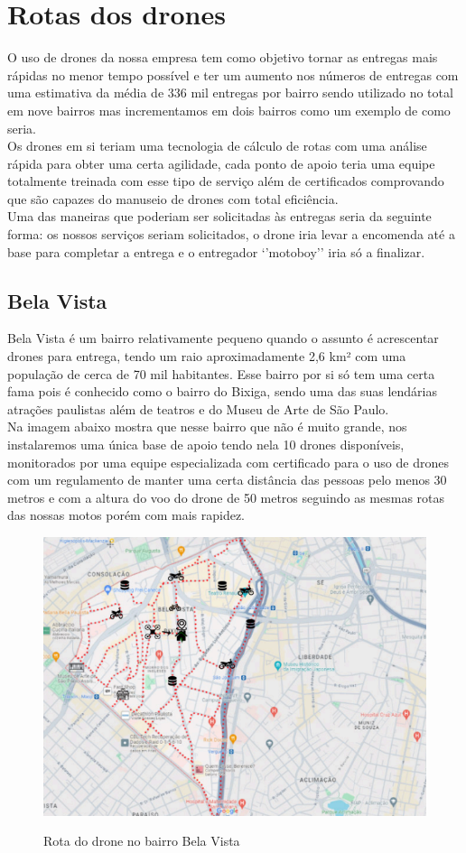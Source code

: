 \chapter{Rotas dos drones}
\label{ch:identificador}
  
O uso de drones da nossa empresa tem como objetivo tornar as entregas mais rápidas no menor tempo possível e ter um aumento nos números de entregas com uma estimativa da média de 336 mil entregas por bairro sendo utilizado no total em nove bairros mas incrementamos em dois bairros como um exemplo de como seria.\\
Os drones em si teriam uma tecnologia de cálculo de rotas com uma análise rápida para obter uma certa agilidade, cada ponto de apoio teria uma equipe totalmente treinada com esse tipo de serviço além de certificados comprovando que são capazes do manuseio de drones com total eficiência.\\
Uma das maneiras que poderiam ser solicitadas às entregas seria da seguinte forma: os nossos serviços seriam solicitados, o drone iria levar a encomenda até a base para completar a entrega e o entregador ‘’motoboy’’ iria só a finalizar.

 \section{Bela Vista}

Bela Vista é um bairro relativamente pequeno quando o assunto é acrescentar drones para entrega, tendo um raio aproximadamente 2,6 km² com uma população de cerca de 70 mil habitantes. Esse bairro por si só tem uma certa fama pois é conhecido como o bairro do Bixiga, sendo uma das suas lendárias atrações paulistas além de teatros e do Museu de Arte de São Paulo.\\
Na imagem abaixo mostra que nesse bairro que não é muito grande, nos instalaremos uma única base de apoio tendo nela 10 drones disponíveis, monitorados por uma equipe especializada com certificado para o uso de drones com um regulamento de manter uma certa distância das pessoas pelo menos 30 metros e com a altura do voo do drone de 50 metros seguindo as mesmas rotas das nossas motos porém com mais rapidez. 

\begin{figure} [!ht]
   { \centering
   \caption{Rota do drone no bairro Bela Vista}
    \includegraphics[width=0.5\linewidth]{figuras/rota bela vista.png}
    \label{fig:enter-label}
    }
\end{figure}

